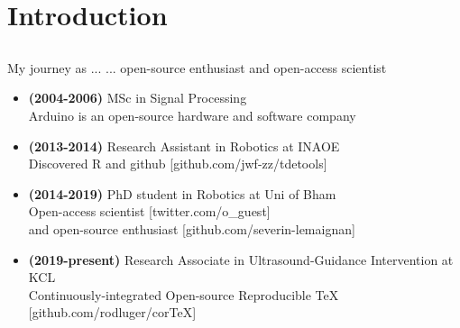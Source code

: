 \section{Introduction}

\subsection{}
{

\begin{frame}{My journey as ...}
... open-source enthusiast and open-access scientist
 
\begin{itemize}	
	\item 
	\textbf{(2004-2006)} MSc in Signal Processing \\
	Arduino is an open-source hardware and software company
	\item \textbf{(2013-2014)} 
	Research Assistant in Robotics at INAOE \\
	Discovered R and github [github.com/jwf-zz/tdetools]
	\item \textbf{(2014-2019)} 
	PhD student in Robotics at Uni of Bham \\
		Open-access scientist [twitter.com/o\_guest] \\
		and 
		open-source enthusiast [github.com/severin-lemaignan] 
	\item \textbf{(2019-present)} 
	Research Associate in Ultrasound-Guidance 
	Intervention at KCL \\
		Continuously-integrated Open-source Reproducible TeX
	[github.com/rodluger/corTeX]
\end{itemize}

	
\end{frame}
}



